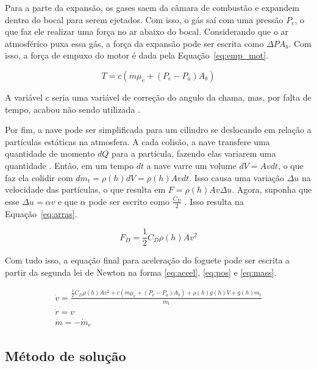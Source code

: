 Para a parte da expansão, os gases saem da câmara de combustão e expandem dentro do bocal para serem ejetados. Com isso, o gás saí com uma pressão \(P_e\), o que faz ele realizar uma força no ar abaixo do bocal. Considerando que o ar atmosférico puxa essa gás, a força da expansão pode ser escrita como \(\Delta P A_b\). Com isso, a força de empuxo do motor é dada pela Equação~\eqref{eq:emp_mot}.

\begin{equation}
  T = c(\dot{m}\mu_e+(P_e-P_a)A_b)
  \label{eq:emp_mot}
\end{equation}

A variável \(c\) seria uma variável de correção do angulo da chama, mas, por falta de tempo, acabou não sendo utilizada \cite{NASA_RocketThrustEquation}.

Por fim, a nave pode ser simplificada para um cilindro se deslocando em relação a partículas estáticas na atmosfera. A cada colisão, a nave transfere uma quantidade de momento \(dQ\) para a partícula, fazendo elas variarem uma quantidade . Então, em um tempo \(dt\) a nave varre um volume \(dV = A v dt\), o que faz ela colidir com \(dm_t = \rho(h)dV=\rho(h)A v dt\). Isso causa uma variação \(\Delta u\) na velocidade das partículas, o que resulta em \(F=\rho(h)A v \Delta u\). Agora, suponha que esse \(\Delta u = \alpha v\) e que \(\alpha\) pode ser escrito como \(\frac{C_D}{2}\) \cite{NASADragEquation}. Isso resulta na Equação~\eqref{eq:arras}.

\begin{equation}
  F_D = \frac{1}{2}C_D \rho(h)A v^2
  \label{eq:arras}
\end{equation}

Com tudo isso, a equação final para aceleração do foguete pode ser escrita a partir da segunda lei de Newton na forma \eqref{eq:accel}, \eqref{eq:pos} e \eqref{eq:mass}.

\begin{center}
  \begin{align}
    \dot{v} = \frac{\frac{1}{2}C_D \rho(h)A v^2+c(\dot{m}\mu_e+(P_e-P_a)A_b)+\rho(h)g(h)V+g(h)m_t}{m_t}\label{eq:accel} \\
    \dot{r}=v\label{eq:pos} \\
    \dot{m}=-\dot{m}_e\label{eq:mass}
  \end{align}
\end{center}

\subsection{Método de solução}

